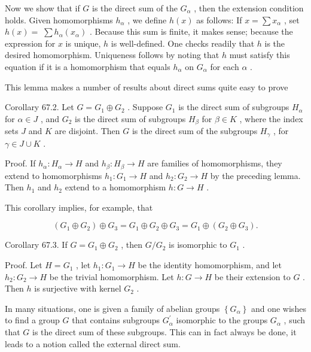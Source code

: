 \documentclass[10pt]{article}
\begin{document}
Now we show that if \(G\) is the direct sum of the \({G}_{\alpha }\) , then the extension condition holds. Given homomorphisms \({h}_{\alpha }\) , we define \(h\left( x\right)\) as follows: If \(x = \sum {x}_{\alpha }\) , set \(h\left( x\right)  = \; \sum {h}_{\alpha }\left( {x}_{\alpha }\right)\) . Because this sum is finite, it makes sense; because the expression for \(x\) is unique, \(h\) is well-defined. One checks readily that \(h\) is the desired homomorphism. Uniqueness follows by noting that \(h\) must satisfy this equation if it is a homomorphism that equals \({h}_{\alpha }\) on \({G}_{\alpha }\) for each \(\alpha\) .

This lemma makes a number of results about direct sums quite easy to prove

Corollary 67.2. Let \(G = {G}_{1} \oplus  {G}_{2}\) . Suppose \({G}_{1}\) is the direct sum of subgroups \({H}_{\alpha }\) for \(\alpha  \in  J\) , and \({G}_{2}\) is the direct sum of subgroups \({H}_{\beta }\) for \(\beta  \in  K\) , where the index sets \(J\) and \(K\) are disjoint. Then \(G\) is the direct sum of the subgroups \({H}_{\gamma }\) , for \(\gamma  \in  J \cup  K\) .

Proof. If \({h}_{\alpha } : {H}_{\alpha } \rightarrow  H\) and \({h}_{\beta } : {H}_{\beta } \rightarrow  H\) are families of homomorphisms, they extend to homomorphisms \({h}_{1} : {G}_{1} \rightarrow  H\) and \({h}_{2} : {G}_{2} \rightarrow  H\) by the preceding lemma. Then \({h}_{1}\) and \({h}_{2}\) extend to a homomorphism \(h : G \rightarrow  H\) .

This corollary implies, for example, that

\[
\left( {{G}_{1} \oplus  {G}_{2}}\right)  \oplus  {G}_{3} = {G}_{1} \oplus  {G}_{2} \oplus  {G}_{3} = {G}_{1} \oplus  \left( {{G}_{2} \oplus  {G}_{3}}\right) .
\]

Corollary 67.3. If \(G = {G}_{1} \oplus  {G}_{2}\) , then \(G/{G}_{2}\) is isomorphic to \({G}_{1}\) .

Proof. Let \(H = {G}_{1}\) , let \({h}_{1} : {G}_{1} \rightarrow  H\) be the identity homomorphism, and let \({h}_{2} : {G}_{2} \rightarrow  H\) be the trivial homomorphism. Let \(h : G \rightarrow  H\) be their extension to \(G\) . Then \(h\) is surjective with kernel \({G}_{2}\) .

In many situations, one is given a family of abelian groups \(\left\{  {G}_{\alpha }\right\}\) and one wishes to find a group \(G\) that contains subgroups \({G}_{\alpha }^{\prime }\) isomorphic to the groups \({G}_{\alpha }\) , such that \(G\) is the direct sum of these subgroups. This can in fact always be done, it leads to a notion called the external direct sum.
\end{document}
